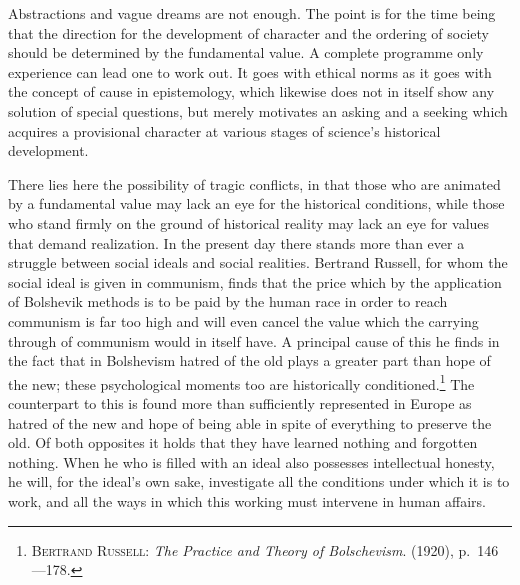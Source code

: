 \documentclass[12pt]{article}
\newcommand{\opage}[1]{\marginnote{\footnotesize\textit{[#1]}}}
\begin{document}
\opage{88}Abstractions and vague dreams are not enough. The point is for the time
being that the direction for the development of character and the ordering
of society should be determined by the fundamental value. A complete
programme only experience can lead one to work out. It goes with ethical
norms as it goes with the concept of cause in epistemology, which likewise
does not in itself show any solution of special questions, but merely
motivates an asking and a seeking which acquires a provisional character at
various stages of science's historical development.

There lies here the possibility of tragic conflicts, in that those who are
animated by a fundamental value may lack an eye for the historical
conditions, while those who stand firmly on the ground of historical reality
may lack an eye for values that demand realization. In the present day there
stands more than ever a struggle between social ideals and social realities.
Bertrand Russell, for whom the social ideal is given in communism, finds
that the price which by the application of Bolshevik methods is to be paid
by the human race in order to reach communism is far too high and will even
cancel the value which the carrying through of communism would in itself
have. A principal cause of this he finds in the fact that in Bolshevism
hatred of the old plays a greater part than hope of the new; these
psychological moments too are historically conditioned.\footnote{\textsc{Bertrand
Russell}: \textit{The Practice and Theory of Bolschevism}. (1920),
p.~146---178.} The counterpart to this is found more than sufficiently
represented in Europe as hatred of the new and hope of being able in spite
of everything to preserve the old. Of both opposites it holds that they have
learned nothing and forgotten nothing. When he who is filled with an ideal
also possesses intellectual honesty, he will, \opage{89}for the ideal's own sake,
investigate all the conditions under which it is to work, and all the ways
in which this working must intervene in human affairs.
\end{document}
